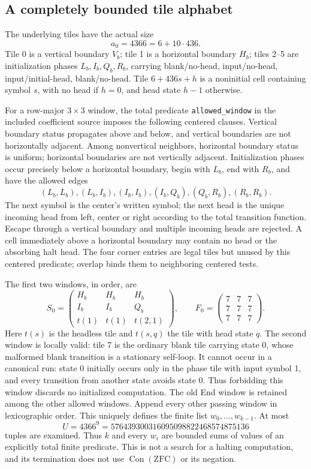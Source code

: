 \documentclass[11pt]{article}
\newcommand{\Con}{\operatorname{Con}}
\begin{document}
\subsection{A completely bounded tile alphabet}
The underlying tiles have the actual size
\[
 a_0=4366=6+10\cdot436.
\]
Tile 0 is a vertical boundary \(V_b\); tile 1 is a horizontal boundary \(H_b\); tiles 2--5 are initialization phases \(L_b,I_b,Q_b,R_b\), carrying blank/no-head, input/no-head, input/initial-head, blank/no-head. Tile \(6+436s+h\) is a noninitial cell containing symbol \(s\), with no head if \(h=0\), and head state \(h-1\) otherwise.

For a row-major \(3\times3\) window, the total predicate \texttt{allowed\_window} in the included coefficient source imposes the following centered clauses. Vertical boundary status propagates above and below, and vertical boundaries are not horizontally adjacent. Among nonvertical neighbors, horizontal boundary status is uniform; horizontal boundaries are not vertically adjacent. Initialization phases occur precisely below a horizontal boundary, begin with \(L_b\), end with \(R_b\), and have the allowed edges
\[
 (L_b,L_b),(L_b,I_b),(I_b,I_b),(I_b,Q_b),(Q_b,R_b),(R_b,R_b).
\]
The next symbol is the center's written symbol; the next head is the unique incoming head from left, center or right according to the total transition function. Escape through a vertical boundary and multiple incoming heads are rejected. A cell immediately above a horizontal boundary may contain no head or the absorbing halt head. The four corner entries are legal tiles but unused by this centered predicate; overlap binds them to neighboring centered tests.

The first two windows, in order, are
\[
 S_0=\begin{pmatrix}H_b&H_b&H_b\\I_b&I_b&Q_b\\t(1)&t(1)&t(2,1)\end{pmatrix},\qquad
 F_0=\begin{pmatrix}7&7&7\\7&7&7\\7&7&7\end{pmatrix}.
\]
Here \(t(s)\) is the headless tile and \(t(s,q)\) the tile with head state \(q\). The second window is locally valid: tile 7 is the ordinary blank tile carrying state 0, whose malformed blank transition is a stationary self-loop. It cannot occur in a canonical run: state 0 initially occurs only in the phase tile with input symbol 1, and every transition from another state avoids state 0. Thus forbidding this window discards no initialized computation. The old End window is retained among the other allowed windows. Append every other passing window in lexicographic order. This uniquely defines the finite list \(w_0,\ldots,w_{k-1}\). At most
\[
 U=4366^9=576439300316095098822468574875136
\]
tuples are examined. Thus \(k\) and every \(w_i\) are bounded sums of values of an explicitly total finite predicate. This is not a search for a halting computation, and its termination does not use \(\Con(\mathrm{ZFC})\) or its negation.
\end{document}
